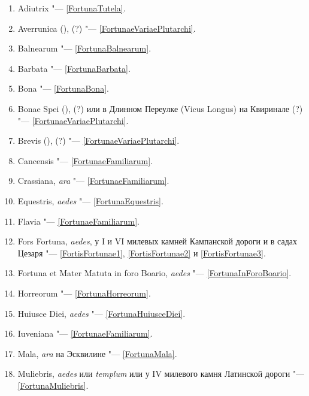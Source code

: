\begin{appendices}
\begin{enumerate}

\item Adiutrix "--- \ref{FortunaTutela}.
\item Averrunica (),  (?) "--- \ref{FortunaeVariaePlutarchi}.
\item Balnearum "--- \ref{FortunaBalnearum}.
\item Barbata "--- \ref{FortunaBarbata}.
\item Bona "--- \ref{FortunaBona}.

\item Bonae Spei (),  (?) или  в Длинном Переулке (Vicus Longus) на Квиринале (?) "--- \ref{FortunaeVariaePlutarchi}.

\item Brevis (),  (?) "--- \ref{FortunaeVariaePlutarchi}.

\item Cancensis "--- \ref{FortunaeFamiliarum}.

\item Crassiana, \textit{ara} "--- \ref{FortunaeFamiliarum}.

\item Equestris, \textit{aedes} "--- \ref{FortunaEquestris}.

\item Flavia "--- \ref{FortunaeFamiliarum}.

\item Fors Fortuna, \textit{aedes}, у I и VI милевых камней Кампанской дороги и в садах Цезаря "--- \ref{FortisFortunae1}, \ref{FortisFortunae2} и \ref{FortisFortunae3}.

\item Fortuna et Mater Matuta in foro Boario, \textit{aedes} "--- \ref{FortunaInForoBoario}.

\item Horreorum "--- \ref{FortunaHorreorum}.

\item Huiusce Diei, \textit{aedes} "--- \ref{FortunaHuiusceDiei}.

\item Iuveniana "--- \ref{FortunaeFamiliarum}.

\item Mala, \textit{ara} на Эсквилине "--- \ref{FortunaMala}.

\item Muliebris, \textit{aedes} или \textit{templum} или  у IV милевого камня Латинской дороги "--- \ref{FortunaMuliebris}.


\end{enumerate}
\end{appendices}
